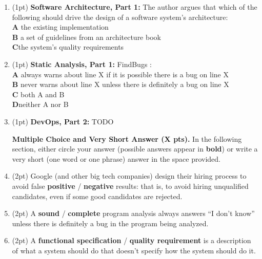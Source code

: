 \documentclass{article}
\newif\ifkey
\newcommand{\correct}[1]{\ifkey\color{red}\textbf{#1}\color{black}\else\textbf{#1}\fi\xspace}
\newcommand*{\pts}[1]{\addtocounter{points}{#1}(#1pt)}
\begin{document}
\begin{spacing}{1.4}
\begin{enumerate}[leftmargin=*]
\item \pts{1}
  \textbf{Software Architecture, Part 1:}
  The author argues that which of the following should drive the design of a software system’s architecture:
  \\ \textbf{A}\hspace{0.2in} the existing implementation
  \\ \textbf{B}\hspace{0.2in} a set of guidelines from an architecture book
  \\ \correct{C}\hspace{0.2in}the system’s quality requirements

\item \pts{1}
  \textbf{Static Analysis, Part 1:}
  FindBugs \underline{\hspace{1in}}:
  \\ \textbf{A}\hspace{0.2in} always warns about line X if it is possible there is a bug on line X
  \\ \textbf{B}\hspace{0.2in} never warns about line X unless there is definitely a bug on line X
  \\ \textbf{C}\hspace{0.2in} both A and B
  \\ \correct{D}\hspace{0.2in}neither A nor B

\item \pts{1}
  \textbf{DevOps, Part 2:}
  TODO

  \newpage

  \textbf{Multiple Choice and Very Short Answer (X pts).} In the following section, either circle your
  answer (possible answers appear in \textbf{bold}) or write a very short (one word or one phrase) answer in the space provided.

\item \pts{2} Google (and other big tech companies) design their hiring process
  to avoid false \correct{positive} / \textbf{negative} results: that is, to avoid hiring unqualified candidates,
  even if some good candidates are rejected.

\item \pts{2} A \textbf{sound} / \correct{complete} program analysis always answers ``I don't know'' unless there
  is definitely a bug in the program being analyzed.

\item \pts{2} A \correct{functional specification} / \textbf{quality requirement} is a description of what a system should do that doesn’t specify how the system should do it.


\end{enumerate}
\end{spacing}
\end{document}
